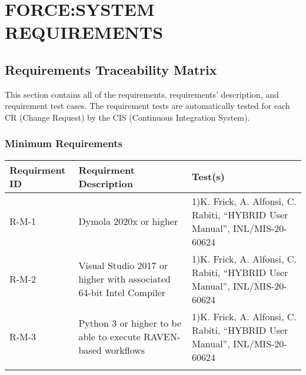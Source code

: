  \section{FORCE:SYSTEM REQUIREMENTS} 
 \subsection{Requirements Traceability Matrix} 
 This section contains all of the requirements, requirements' description, and 
 requirement test cases. The requirement tests are automatically tested for each 
 CR (Change Request) by the CIS (Continuous Integration System). 
 \newcolumntype{b}{X} 
 \subsubsection{Minimum Requirements} 
\begin{tabularx}{\textwidth}{|s|s|b|} 
\hline 
\textbf{Requirment ID} & \textbf{Requirment Description} & \textbf{Test(s)}  \\ \hline 
\hline 
 \hspace{0pt}R-M-1 & \hspace{0pt}Dymola 2020x or higher & \hspace{0pt}1)K. Frick, A. Alfonsi, C. Rabiti, ``HYBRID User Manual'', INL/MIS-20-60624 \\ \hline 
\hline 
 \hspace{0pt}R-M-2 & \hspace{0pt}Visual Studio 2017 or higher with associated 64-bit Intel Compiler & \hspace{0pt}1)K. Frick, A. Alfonsi, C. Rabiti, ``HYBRID User Manual'', INL/MIS-20-60624 \\ \hline 
\hline 
 \hspace{0pt}R-M-3 & \hspace{0pt}Python 3 or higher to be able to execute RAVEN-based workflows & \hspace{0pt}1)K. Frick, A. Alfonsi, C. Rabiti, ``HYBRID User Manual'', INL/MIS-20-60624 \\ \hline 
\hline 
\caption*{Minimum Requirements}
\end{tabularx} 

